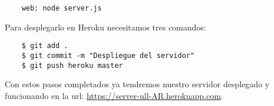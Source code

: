 \begin{lstlisting}
    web: node server.js
\end{lstlisting}

Para desplegarlo en Heroku necesitamos tres comandos:

\begin{lstlisting}
    $ git add .
    $ git commit -m "Despliegue del servidor"
    $ git push heroku master
\end{lstlisting}

Con estos pasos completados ya tendremos nuestro servidor desplegado y funcionando en la url: \href{https://server-ull-AR.herokuapp.com}{https://server-ull-AR.herokuapp.com}.




